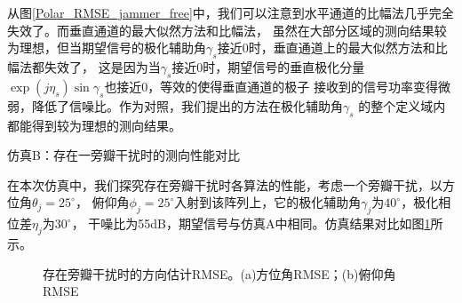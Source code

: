 \documentclass[master]{thesis-uestc}
\begin{document}
从图\ref{Polar_RMSE_jammer_free}中，我们可以注意到水平通道的比幅法几乎完全失效了。而垂直通道的最大似然方法和比幅法，
虽然在大部分区域的测向结果较为理想，但当期望信号的极化辅助角$\gamma_s$接近0时，垂直通道上的最大似然方法和比幅法都失效了，
这是因为当$\gamma_s$接近0时，期望信号的垂直极化分量$\exp(j\eta_s)\sin\gamma_s$也接近0，等效的使得垂直通道的极子
接收到的信号功率变得微弱，降低了信噪比。作为对照，我们提出的方法在极化辅助角$\gamma_s$
的整个定义域内都能得到较为理想的测向结果。

仿真B：存在一旁瓣干扰时的测向性能对比

在本次仿真中，我们探究存在旁瓣干扰时各算法的性能，考虑一个旁瓣干扰，以方位角$\theta_j=25^\circ$，
俯仰角$\phi_j=25^\circ$入射到该阵列上，它的极化辅助角$\gamma_j$为$40^\circ$，极化相位差$\eta_j$为$30^\circ$，
干噪比为55dB，期望信号与仿真A中相同。仿真结果对比如图\ref{Polar_RMSE_SLJ}所示。
\begin{figure}[h]
    \floatcontinue
    \caption{存在旁瓣干扰时的方向估计RMSE。(a)方位角RMSE；(b)俯仰角RMSE}
    \label{Polar_RMSE_SLJ}
\end{figure}
\end{document}
